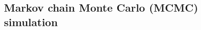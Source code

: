 \documentclass[handout]{beamer}
\begin{document}
\subsection{Markov chain Monte Carlo (MCMC) simulation}



\end{document}
